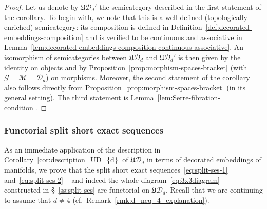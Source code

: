 \documentclass[AHL,Unicode,published]{cedram}
\newcommand{\fU}{\ensuremath{\mathfrak{U}}}
\newcommand{\cD}{\mathcal{D}}
\newcommand{\cG}{\mathcal{G}}
\newcommand{\cM}{\mathcal{M}}
\begin{document}
\begin{proof}
Let us denote by $\fU\cD_{d}'$ the semicategory described in the first statement of the corollary. To begin with, we note that this is a well-defined (topologically-enriched) semicategory: its composition is defined in Definition~\ref{def:decorated-embeddings-composition} and is verified to be continuous and associative in Lemma~\ref{lem:decorated-embeddings-composition-continuous-associative}. An isomorphism of semicategories between $\fU\cD_{d}$ and $\fU\cD_{d}'$ is then given by the identity on objects and by Proposition~\ref{prop:morphism-spaces-bracket} (with $\cG = \cM = \cD_{d}$) on morphisms. Moreover, the second statement of the corollary also follows directly from Proposition~\ref{prop:morphism-spaces-bracket} (in its general setting). The third statement is Lemma~\ref{lem:Serre-fibration-condition}.
\end{proof}


\subsubsection{Functorial split short exact sequences}\label{sss:functorial-split-ses}

As an immediate application of the description in Corollary~\ref{cor:description_UD_{d}} of $\fU\cD_{d}$ in terms of decorated embeddings of manifolds, we prove that the split short exact sequences~\eqref{eq:split-ses-1} and~\eqref{eq:split-ses-2} -- and indeed the whole diagram~\eqref{eq:3x3diagram} -- constructed in \S~\ref{ss:split-ses} are functorial on $\fU\cD_{d}$. Recall that we are continuing to assume that $d \neq 4$ (cf.~Remark~\ref{rmk:d_neq_4_explanation}).
\end{document}
